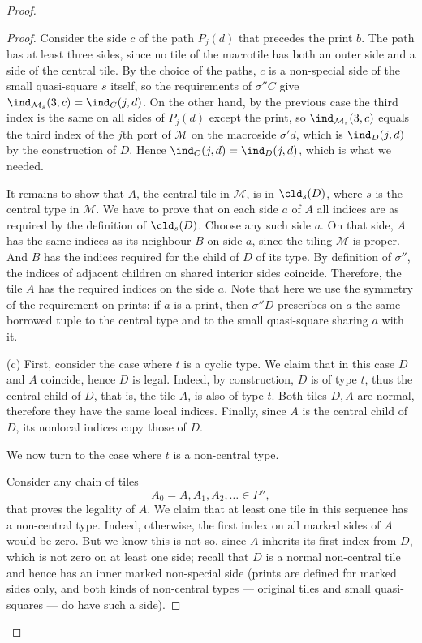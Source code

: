 \documentclass[12pt]{article}
\theoremstyle{remark}
\begin{document}
\begin{proof}
\begin{proof}
Consider the side $c$ of the path $P_j(d)$ that precedes the print $b$. The path has at least
three sides, since no tile of the macrotile has both an outer side and a side of the central tile.
By the choice of the paths, $c$ is a non-special side of the small quasi-square $s$ itself, so the
requirements of $\sigma''C$ give $\ind_{\mathcal M_s}(3,c)=\ind_C(j,d)$. On the other hand, by the
previous case the third index is the same on all sides of $P_j(d)$ except the print, so
$\ind_{\mathcal M_s}(3,c)$ equals the third index of the $j$th port of $\mathcal M$ on the
macroside $\sigma'd$, which is $\ind_D(j,d)$ by the construction of $D$. Hence
$\ind_C(j,d)=\ind_D(j,d)$, which is what we needed.




   It remains to show that $A$, the central tile in $\mathcal M$, is in  $\cld_s(D)$, where
   $s$ is the central type in $\mathcal M$. 
     We have to prove that on each side $a$ of $A$ all
    indices are as required by the definition of $\cld_s(D)$. Choose any such side $a$.
    On that side, $A$ has the same indices as its neighbour $B$ on side $a$,
    since the tiling $\mathcal{M}$ is proper.
    And $B$  has the indices required for the child of $D$ of its type.
    By definition of $\sigma''$,  the indices of adjacent children on shared interior sides coincide.
    Therefore, the tile $A$ has the required indices on the side $a$. Note that here we use the
    symmetry of the requirement on prints: if $a$ is a print, then $\sigma''D$ prescribes on $a$
    the same borrowed tuple to the central type and to the small quasi-square sharing $a$ with it.

    (c) 
First, consider the case where $t$ is a cyclic type. We
claim that in this case $D$ and $A$ coincide, hence $D$ is legal.
Indeed, by construction, $D$ is of type $t$, thus the central child of $D$,
that is, the tile $A$, is also of type $t$. Both tiles $D,A$ are normal, therefore 
they have the same local indices. Finally, since $A$ is 
the central child of $D$,
its nonlocal indices copy those of $D$.

We now turn to the case where $t$ is a non-central type.

Consider any chain of tiles
$$
A_0=A,A_1,A_2,\dots\in P'',
$$
that proves the legality of $A$.
We claim that at least one tile in this sequence has a non-central type.
Indeed, otherwise, the first index on all marked sides of $A$ would be zero.
But we know this is not so, since $A$ inherits its first index from $D$,
which is not zero on at least one side; recall that $D$ is a normal non-central tile
and hence has an inner marked non-special side (prints are defined for marked sides only, and both
kinds of non-central types --- original tiles and small quasi-squares --- do have such a side).


\end{proof}
\end{proof}
\end{document}
